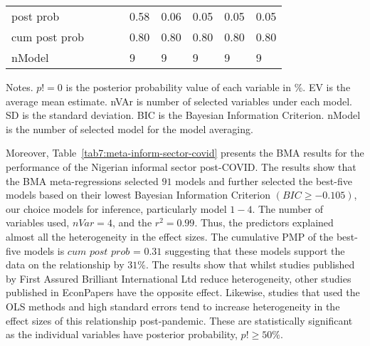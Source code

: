 \documentclass[a4paper, 12pt]{article}
\begin{document}
\begin{table}[H]
{\begin{tabular}{@{}lllllllll@{}}
                post prob                   &        &         &        & 0.58    & 0.06    & 0.05    & 0.05    & 0.05    \\
                cum post prob               &        &         &        & 0.80    & 0.80    & 0.80    & 0.80    & 0.80    \\
                nModel                      &        &         &        & 9       & 9       & 9       & 9       & 9       \\ \bottomrule
            \end{tabular}%
        }
        \begin{minipage}{18cm}
            \vspace{0.1cm}
            \small Notes. $p!=0$ is the posterior probability value of each variable in \%. EV is the average mean estimate. nVAr is number of selected variables under each model. SD is the standard deviation. BIC is the Bayesian Information Criterion. nModel is the number of selected model for the model averaging.
        \end{minipage}
    \end{table}

    Moreover, Table~\ref{tab7:meta-inform-sector-covid} presents the BMA results for the performance of the Nigerian informal sector post-COVID. The results show that the BMA meta-regressions selected $91$ models and further selected the best-five models based on their lowest Bayesian Information Criterion $(BIC \geq -0.105)$, our choice models for inference, particularly model $1-4$. The number of variables used, $nVar = 4$, and the $r^2 = 0.99$. Thus, the predictors explained almost all the heterogeneity in the effect sizes. The cumulative PMP of the best-five models is $cum$ $post$ $prob$ = $0.31$ suggesting that these models support the data on the relationship by $31\%$. The results show that whilst studies published by First Assured Brilliant International Ltd reduce heterogeneity, other studies published in EconPapers have the opposite effect. Likewise, studies that used the OLS methods and high standard errors tend to increase heterogeneity in the effect sizes of this relationship post-pandemic. These are statistically significant as the individual variables have posterior probability, $p! \geq 50\%$.
\end{document}
